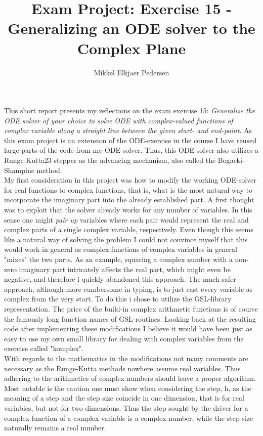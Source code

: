 \documentclass[onecolumn]{article}
\begin{document}
\title{Exam Project: Exercise 15 - Generalizing an ODE solver to the Complex Plane}
\date{}
\author{Mikkel Elkjaer Pedersen}
\maketitle

This short report presents my reflections on the exam exercise 15: \textit{Generalize the ODE solver of your choice to solve ODE with 
complex-valued functions of complex variable along a straight line between the given start- and end-point}.
As this exam project is an extension of the ODE-exercise in the course I have reused large parts of the code from my ODE-solver.
Thus, this ODE-solver also utilizes a Runge-Kutta23 stepper as the advancing mechanism, also called the Bogacki-Shampine method. \\

My first consideration in this project was how to modify the working ODE-solver for real functions to complex functions, that is,
what is the most natural way to incorporate the imaginary part into the already established part. A first thought was to exploit that the
solver already works for any number of variables. In this sense one might \textit{pair up} variables where each pair would represent the
real and complex parts of a single complex variable, respectively. Even though this seems like a natural way of solving the problem I could 
not convince myself that this would work in general as complex functions of complex variables in general "mixes" the two parts. 
As an example, squaring a complex number with a non-zero imaginary part intricately affects the real part, which might even be negative, 
and therefore i quickly abandoned this approach. The much safer approach, although more cumbersome in typing, is to just cast every variable 
as complex from the very start. To do this i chose to utilize the GSL-library representation. The price of the build-in complex
arithmetic functions is of course the famously long function names of GSL-routines. Looking back at the resulting code after implementing 
these modifications I believe it would have been just as easy to use my own small library for dealing with complex variables from the 
exercise called "komplex".\\

With regards to the mathematics in the modifications not many comments are necessary as the Runge-Kutta methods nowhere assume real variables. 
Thus adhering to the arithmetics of complex numbers should leave a proper algorithm. 
Most notable is the caution one must show when considering the step, $\mathrm{h}$, as the meaning of a step and the step size coincide in 
one dimension, that is for real variables, but not for two dimensions. Thus the step sought by the driver for a complex function of a 
complex variable is a complex number, while the step size naturally remains a real number.\\
\end{document}
